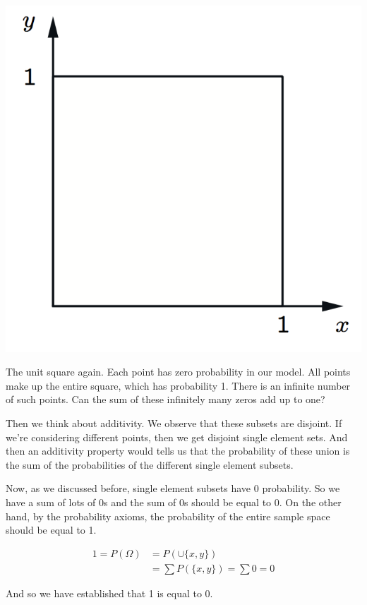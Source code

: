 \documentclass{tufte-handout}
\begin{document}
\begin{marginfigure}
  \includegraphics{ContSampleSpace}
  \caption{The unit square again. Each point has zero probability in our model. All points make up the entire square, which has probability 1. There is an infinite number of such points. Can the sum of these infinitely many zeros add up to one?}
\end{marginfigure}


Then we think about additivity. We observe that these subsets are disjoint. If we're considering different
points, then we get disjoint single element sets. And then an additivity property would tells us that the
probability of these union is the sum of the probabilities of the different single element subsets.

Now, as we discussed before, single element subsets have 0 probability. So we have a sum of lots of 0s
and the sum of 0s should be equal to 0. On the other hand, by the probability axioms, the probability of
the entire sample space should be equal to 1. 

\begin{align*}
1 = P(\Omega) &=  P ( \cup \{ x, y\} ) \\
&=  \sum P(\{ x, y\} ) = \sum 0 = 0
\end{align*}

And so we have established that 1 is equal to 0. 
\end{document}
